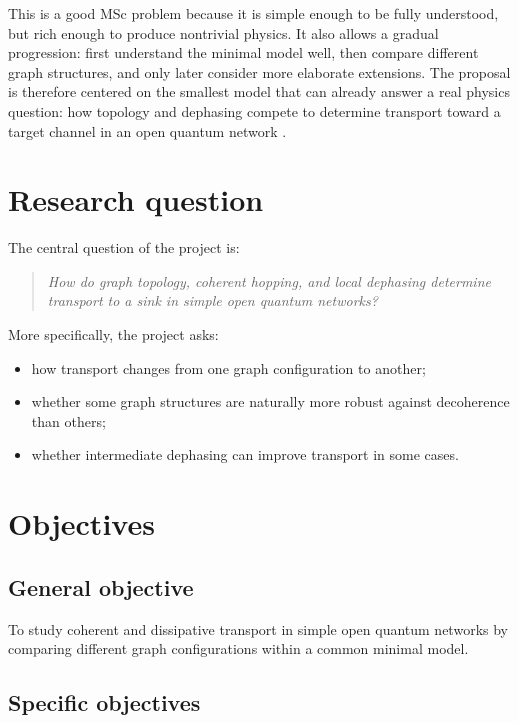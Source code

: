 \documentclass[11pt,a4paper]{article}
\begin{document}
This is a good MSc problem because it is simple enough to be fully understood,
but rich enough to produce nontrivial physics. It also allows a gradual
progression: first understand the minimal model well, then compare different
graph structures, and only later consider more elaborate extensions. The
proposal is therefore centered on the smallest model that can already answer a
real physics question: how topology and dephasing compete to determine
transport toward a target channel in an open quantum network
\citep{breuer_petruccione_2007,rivas_huelga_2012}.

\section{Research question}

The central question of the project is:

\begin{quote}
\emph{How do graph topology, coherent hopping, and local dephasing determine
transport to a sink in simple open quantum networks?}
\end{quote}

More specifically, the project asks:
\begin{itemize}
  \item how transport changes from one graph configuration to another;
  \item whether some graph structures are naturally more robust against
  decoherence than others;
  \item whether intermediate dephasing can improve transport in some cases.
\end{itemize}

\section{Objectives}

\subsection{General objective}

To study coherent and dissipative transport in simple open quantum networks by
comparing different graph configurations within a common minimal model.

\subsection{Specific objectives}
\end{document}

